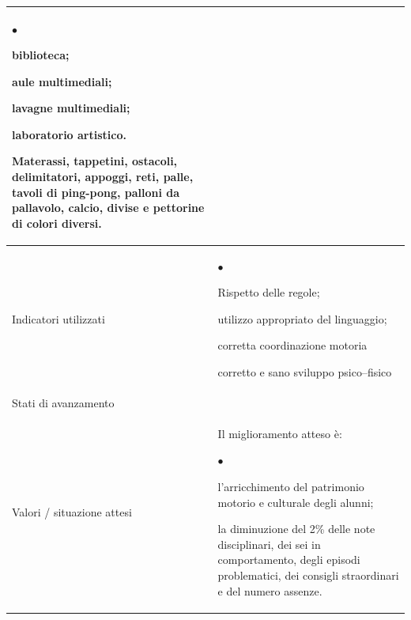 \documentclass[12pt,a4paper,oneside]{memoir}
\newenvironment{elenco}{\begin{list}{$\bullet$}{%
              \setlength{\leftmargin}{4mm}%
              \setlength{\rightmargin}{1mm}%
               \setlength{\itemindent}{0mm}%
               \setlength{\labelwidth}{2mm}%
               \setlength{\labelsep}{2mm}%
              \setlength{\itemsep}{-\parsep}%
              \setlength{\partopsep}{0pt}%
              \setlength{\topsep}{0pt}%
             \setlength{\parskip}{0pt}%
              }}{\end{list}}
\begin{document}
\begin{footnotesize}
\begin{longtable}{|>{\raggedright}p{2.5cm}|>{\raggedright\arraybackslash}P{10cm}|}
\begin{elenco}
\item biblioteca;
\item aule multimediali;
\item lavagne multimediali;
\item laboratorio artistico.
\item Materassi, tappetini, ostacoli, delimitatori, appoggi, reti, palle, tavoli di ping-pong, palloni da pallavolo, calcio, divise e pettorine di colori diversi.
\end{elenco}\\[-4mm] \hline
Indicatori utilizzati&\begin{elenco}
\item Rispetto delle regole;
\item utilizzo appropriato del linguaggio;
\item corretta coordinazione motoria
\item corretto e sano sviluppo psico–fisico
\end{elenco}\\[-4mm] \hline
Stati di avanzamento&\\ \hline
Valori / situazione attesi&Il miglioramento atteso è:
\begin{elenco}
\item l'arricchimento del patrimonio motorio e culturale degli alunni;
\item la diminuzione del 2\% delle note disciplinari, dei sei in comportamento, degli episodi problematici, dei consigli straordinari e del numero assenze.
\end{elenco}\\ \hline
\end{longtable}
\end{footnotesize}
\end{document}
